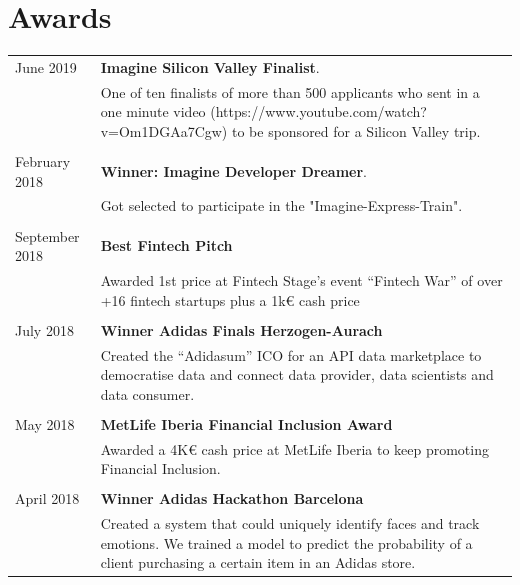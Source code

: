 \documentclass[11pt]{article}
\begin{document}
\section*{Awards}
\begin{tabularx}{\textwidth}{lX}
  June 2019      & \textbf{Imagine Silicon Valley Finalist}. \\
                 &  One of ten finalists of more than 500 applicants who sent in a one minute
                   video (https://www.youtube.com/watch?v=Om1DGAa7Cgw) to be sponsored for a Silicon Valley trip. \\\\
  February 2018  & \textbf{Winner: Imagine Developer Dreamer}. \\
                 &  Got selected to participate in the "Imagine-Express-Train". \\\\
  September 2018 & \textbf{Best Fintech Pitch} \\
                 & Awarded 1st price at Fintech Stage's event ``Fintech War'' of over
                   +16 fintech startups plus a 1k€ cash price \\\\
  July 2018      & \textbf{Winner Adidas Finals Herzogen-Aurach} \\
                 &  Created the ``Adidasum'' ICO for an API data marketplace to
                   democratise data and connect data provider, data scientists and
                   data consumer.\\\\
  May 2018       & \textbf{MetLife Iberia Financial Inclusion Award} \\
                 & Awarded a 4K€ cash price at MetLife Iberia to keep
                   promoting Financial Inclusion. \\\\
  April 2018     & \textbf{Winner Adidas Hackathon Barcelona} \\
                 & Created a system that could uniquely identify faces and track
                   emotions. We trained a model to predict the probability of a
                   client purchasing a certain item in an Adidas store.
\end{tabularx}
		


\end{document}
